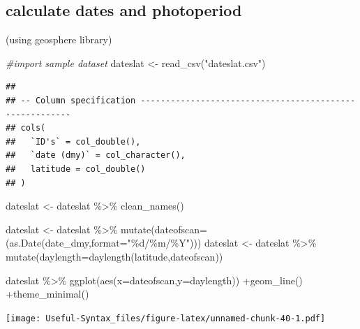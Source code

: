 \documentclass[
]{article}
\newenvironment{Shaded}{\begin{snugshade}}{\end{snugshade}}
\newcommand{\AttributeTok}[1]{\textcolor[rgb]{0.77,0.63,0.00}{#1}}
\newcommand{\CommentTok}[1]{\textcolor[rgb]{0.56,0.35,0.01}{\textit{#1}}}
\newcommand{\FunctionTok}[1]{\textcolor[rgb]{0.00,0.00,0.00}{#1}}
\newcommand{\NormalTok}[1]{#1}
\newcommand{\OtherTok}[1]{\textcolor[rgb]{0.56,0.35,0.01}{#1}}
\newcommand{\SpecialCharTok}[1]{\textcolor[rgb]{0.00,0.00,0.00}{#1}}
\newcommand{\StringTok}[1]{\textcolor[rgb]{0.31,0.60,0.02}{#1}}
\begin{document}
\hypertarget{calculate-dates-and-photoperiod}{%
\subsection{calculate dates and photoperiod}\label{calculate-dates-and-photoperiod}}

(using geosphere library)

\begin{Shaded}
\begin{Highlighting}[]
\CommentTok{\#import sample dataset}
\NormalTok{dateslat }\OtherTok{\textless{}{-}} \FunctionTok{read\_csv}\NormalTok{(}\StringTok{"dateslat.csv"}\NormalTok{)}
\end{Highlighting}
\end{Shaded}

\begin{verbatim}
## 
## -- Column specification --------------------------------------------------------
## cols(
##   `ID's` = col_double(),
##   `date (dmy)` = col_character(),
##   latitude = col_double()
## )
\end{verbatim}

\begin{Shaded}
\begin{Highlighting}[]
\NormalTok{dateslat }\OtherTok{\textless{}{-}}\NormalTok{ dateslat }\SpecialCharTok{\%\textgreater{}\%}
  \FunctionTok{clean\_names}\NormalTok{()}

\NormalTok{dateslat }\OtherTok{\textless{}{-}}\NormalTok{ dateslat }\SpecialCharTok{\%\textgreater{}\%} \FunctionTok{mutate}\NormalTok{(}\AttributeTok{dateofscan=}\NormalTok{(}\FunctionTok{as.Date}\NormalTok{(date\_dmy,}\AttributeTok{format=}\StringTok{"\%d/\%m/\%Y"}\NormalTok{)))}
\NormalTok{dateslat }\OtherTok{\textless{}{-}}\NormalTok{ dateslat }\SpecialCharTok{\%\textgreater{}\%} \FunctionTok{mutate}\NormalTok{(}\AttributeTok{daylength=}\FunctionTok{daylength}\NormalTok{(latitude,dateofscan))}
                                
\NormalTok{dateslat }\SpecialCharTok{\%\textgreater{}\%} \FunctionTok{ggplot}\NormalTok{(}\FunctionTok{aes}\NormalTok{(}\AttributeTok{x=}\NormalTok{dateofscan,}\AttributeTok{y=}\NormalTok{daylength)) }\SpecialCharTok{+}\FunctionTok{geom\_line}\NormalTok{() }\SpecialCharTok{+}\FunctionTok{theme\_minimal}\NormalTok{()}
\end{Highlighting}
\end{Shaded}

\texttt{[image: Useful-Syntax\_files/figure-latex/unnamed-chunk-40-1.pdf]}
\end{document}
